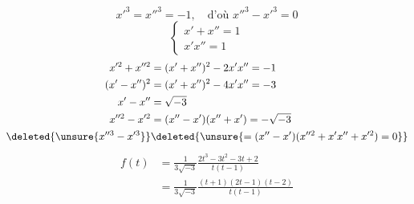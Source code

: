 \[
x'^3=x''^3=-1,\quad\text{d'où }x''^3-x'^3=0
\]
\[
\left\{\begin{array}{l}x'+x''=1\\x'x''=1\end{array}\right.
\]
\[
\begin{aligned}
x'^2+x''^2&=(x'+x'')^2-2x'x''=-1\\
(x'-x'')^2&=(x'+x'')^2-4x'x''=-3\\
x'-x''&=\sqrt{-3}\\
x''^2-x'^2&=(x''-x')(x''+x')=-\sqrt{-3}\\
\deleted{\unsure{x''^3-x'^3}}&\deleted{\unsure{=(x''-x')(x''^2+x'x''+x'^2)=0}}
\end{aligned}
\]
\[
\begin{aligned}
f(t)&=\frac1{3\sqrt{-3}}\frac{2t^3-3t^2-3t+2}{t(t-1)}\\
&=\frac1{3\sqrt{-3}}\frac{(t+1)(2t-1)(t-2)}{t(t-1)}
\end{aligned}
\]
